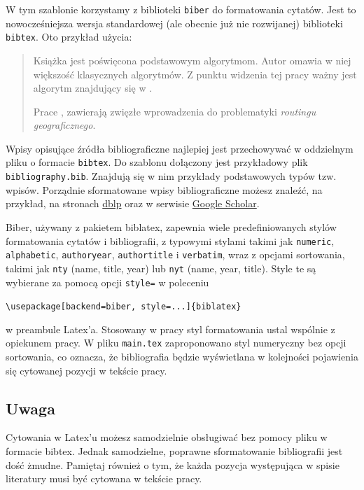 W tym szablonie korzystamy z biblioteki \texttt{biber} do formatowania cytatów. 
Jest to nowocześniejsza wersja standardowej (ale obecnie już nie rozwijanej) biblioteki \texttt{bibtex}.
Oto przykład użycia:

\begin{quote}
   Książka \cite{KNUTH01} jest poświęcona podstawowym algorytmom. 
   Autor \citeauthor{KNUTH01} omawia w niej większość klasycznych algorytmów. 
   Z punktu widzenia tej pracy ważny jest algorytm znajdujący się w \textcite[249]{KNUTH02}.\par
   Prace \cite{KuhnWZ08}, \cite{PapaGeo07} zawierają zwięzłe wprowadzenia do problematyki \textit{routingu geograficznego}.
\end{quote}

Wpisy opisujące źródła bibliograficzne najlepiej jest przechowywać w oddzielnym pliku o formacie \texttt{bibtex}. 
Do szablonu dołączony jest przykładowy plik \texttt{bibliography.bib}. Znajdują się w nim przykłady podstawowych typów tzw. wpisów.
Porządnie sformatowane wpisy bibliograficzne możesz znaleźć, na przykład, na stronach 
\href{https://dblp.org/}{dblp} oraz w serwisie \href{https://scholar.google.com/}{Google Scholar}. \par


Biber, używany z pakietem biblatex, zapewnia wiele predefiniowanych stylów formatowania cytatów i bibliografii, z typowymi stylami takimi jak  
\texttt{numeric}, \texttt{alphabetic}, \texttt{authoryear}, \texttt{authortitle} i \texttt{verbatim}, 
wraz z opcjami sortowania, takimi jak \texttt{nty} (name, title, year) lub \texttt{nyt} (name, year, title). 
Style te są wybierane za pomocą opcji \texttt{style=} w poleceniu 
\begin{center}
\verb|\usepackage[backend=biber, style=...]{biblatex}| 
\end{center}
w preambule Latex'a. Stosowany w pracy styl formatowania ustal wspólnie z opiekunem pracy. W pliku \texttt{main.tex} zaproponowano styl numeryczny bez opcji sortowania, co oznacza, że bibliografia będzie wyświetlana w kolejności pojawienia się cytowanej pozycji w tekście pracy. 

\subsection*{Uwaga} Cytowania w Latex'u możesz samodzielnie obsługiwać bez pomocy pliku w formacie bibtex. Jednak samodzielne, poprawne sformatowanie bibliografii jest dość żmudne. Pamiętaj również o tym, że każda pozycja występująca w spisie literatury musi być cytowana w tekście pracy.  

